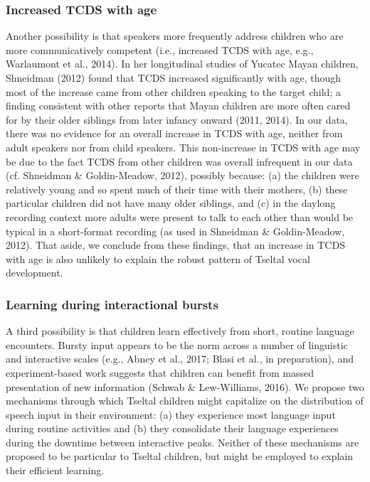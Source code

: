 \documentclass[floatsintext,man]{apa6}
\theoremstyle{definition}
\theoremstyle{definition}
\theoremstyle{definition}
\theoremstyle{remark}
\begin{document}
\subsubsection{Increased TCDS with age}\label{increased-tcds-with-age}

Another possibility is that speakers more frequently address children
who are more communicatively competent (i.e., increased TCDS with age,
e.g., Warlaumont et al., 2014). In her longitudinal studies of Yucatec
Mayan children, Shneidman (2012) found that TCDS increased significantly
with age, though most of the increase came from other children speaking
to the target child; a finding consistent with other reports that Mayan
children are more often cared for by their older siblings from later
infancy onward (2011, 2014). In our data, there was no evidence for an
overall increase in TCDS with age, neither from adult speakers nor from
child speakers. This non-increase in TCDS with age may be due to the
fact TCDS from other children was overall infrequent in our data (cf.
Shneidman \& Goldin-Meadow, 2012), possibly because: (a) the children
were relatively young and so spent much of their time with their
mothers, (b) these particular children did not have many older siblings,
and (c) in the daylong recording context more adults were present to
talk to each other than would be typical in a short-format recording (as
used in Shneidman \& Goldin-Meadow, 2012). That aside, we conclude from
these findings, that an increase in TCDS with age is also unlikely to
explain the robust pattern of Tseltal vocal development.

\subsubsection{Learning during interactional
bursts}\label{learning-during-interactional-bursts}

A third possibility is that children learn effectively from short,
routine language encounters. Bursty input appears to be the norm across
a number of linguistic and interactive scales (e.g., Abney et al., 2017;
Blasi et al., in preparation), and experiment-based work suggests that
children can benefit from massed presentation of new information (Schwab
\& Lew-Williams, 2016). We propose two mechanisms through which Tseltal
children might capitalize on the distribution of speech input in their
environment: (a) they experience most language input during routine
activities and (b) they consolidate their language experiences during
the downtime between interactive peaks. Neither of these mechanisms are
proposed to be particular to Tseltal children, but might be employed to
explain their efficient learning.
\end{document}
